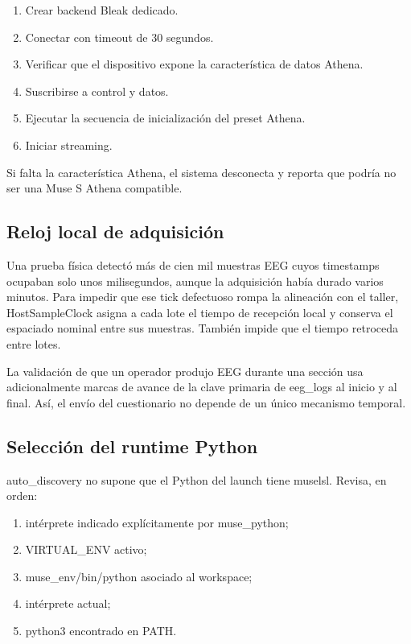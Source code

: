 \documentclass[11pt,a4paper]{article}
\begin{document}
\begin{enumerate}
\item Crear backend Bleak dedicado.
\item Conectar con timeout de 30 segundos.
\item Verificar que el dispositivo expone la característica de datos Athena.
\item Suscribirse a control y datos.
\item Ejecutar la secuencia de inicialización del preset Athena.
\item Iniciar streaming.
\end{enumerate}

Si falta la característica Athena, el sistema desconecta y reporta que podría no ser una Muse S Athena compatible.

\subsection{Reloj local de adquisición}

Una prueba física detectó más de cien mil muestras EEG cuyos timestamps ocupaban solo unos milisegundos, aunque la adquisición había durado varios minutos. Para impedir que ese tick defectuoso rompa la alineación con el taller, {\ttfamily\small HostSampleClock} asigna a cada lote el tiempo de recepción local y conserva el espaciado nominal entre sus muestras. También impide que el tiempo retroceda entre lotes.

La validación de que un operador produjo EEG durante una sección usa adicionalmente marcas de avance de la clave primaria de {\ttfamily\small eeg\_logs} al inicio y al final. Así, el envío del cuestionario no depende de un único mecanismo temporal.

\subsection{Selección del runtime Python}

{\ttfamily\small auto\_discovery} no supone que el Python del launch tiene {\ttfamily\small muselsl}. Revisa, en orden:

\begin{enumerate}
\item intérprete indicado explícitamente por {\ttfamily\small muse\_python};
\item {\ttfamily\small VIRTUAL\_ENV} activo;
\item {\ttfamily\small muse\_env/bin/python} asociado al workspace;
\item intérprete actual;
\item {\ttfamily\small python3} encontrado en {\ttfamily\small PATH}.
\end{enumerate}
\end{document}
